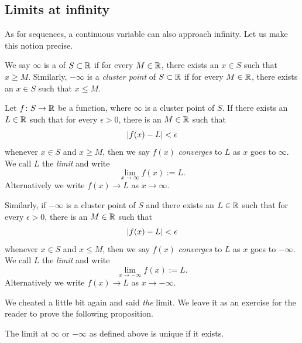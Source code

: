 \subsection{Limits at infinity}

As for sequences, a continuous variable can also approach infinity.  Let
us make this notion precise.

\begin{defn}
We say $\infty$ is a \emph{} of $S \subset {\mathbb{R}}$ if for every
$M \in {\mathbb{R}}$, there exists an $x \in S$ such that $x \geq M$.  Similarly,
$- \infty$ is a \emph{cluster point} of $S \subset {\mathbb{R}}$ if for every
$M \in {\mathbb{R}}$, there exists an $x \in S$ such that $x \leq M$.

%
Let $f \colon S \to {\mathbb{R}}$ be a function, where 
$\infty$ is a cluster point of $S$.
If there exists an $L \in {\mathbb{R}}$
such that for every $\epsilon > 0$, there is an $M \in {\mathbb{R}}$ such that
\begin{equation*}
\left\lvert {f(x) - L} \right\rvert < \epsilon 
\end{equation*}
whenever $x \in S$ and $x \geq M$, then we say $f(x)$
\emph{converges} to $L$
as $x$ goes to $\infty$.  We call $L$ the \emph{limit}
and write
\begin{equation*}
\lim_{x \to \infty} f(x) := L .
\end{equation*}
Alternatively we write $f(x) \to L$ as $x \to \infty$.

Similarly, if $-\infty$ is a cluster point of $S$
and
there exists an $L \in {\mathbb{R}}$
such that for every $\epsilon > 0$, there is an $M \in {\mathbb{R}}$ such that
\begin{equation*}
\left\lvert {f(x) - L} \right\rvert < \epsilon 
\end{equation*}
whenever $x \in S$ and $x \leq M$, then we say $f(x)$ \emph{converges} to $L$
as $x$ goes to $-\infty$.  We call $L$ the \emph{limit} and write
\begin{equation*}
\lim_{x \to -\infty} f(x) := L .
\end{equation*}
Alternatively we write $f(x) \to L$ as $x \to -\infty$.
\end{defn}

We cheated a little bit again and said \emph{the} limit.
We leave it as an exercise for the reader to prove the following proposition.

\begin{prop} \label{liminfty:unique}
The limit at $\infty$ or $-\infty$ as defined above is unique if it exists.
\end{prop}

